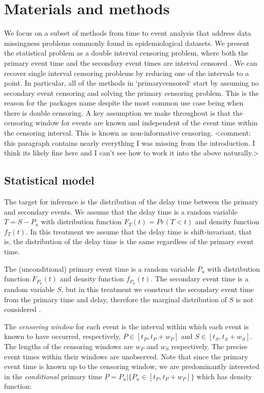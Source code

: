 \documentclass[10pt,letterpaper]{article}
\begin{document}
\section*{Materials and methods}


We focus on a subset of methods from time to event analysis that address data missingness problems commonly found in epidemiological datasets. We present the statistical problem as a double interval censoring problem, where both the primary event time and the secondary event times are interval censored \cite{Reich2009-aa}. We can recover single interval censoring problems by reducing one of the intervals to a point. In particular, all of the methods in `primarycensored` start by assuming no secondary event censoring and solving the primary censoring problem. This is the reason for the packages name despite the most common use case being when there is double censoring. A key assumption we make throughout is that the censoring window for events are known and independent of the event time within the censoring interval. This is known as non-informative censoring. <comment: this paragraph contains nearly everything I was missing from the introduction. I think its likely fine here and I can't see how to work it into the above naturally.>

\subsection*{Statistical model}
The target for inference is the distribution of the delay time between the primary and secondary events. We assume that the delay time is a random variable $T = S - P_{u}$ with distribution function $F_T(t) = Pr(T < t)$ and density function $f_T(t)$. In this treatment we assume that the delay time is shift-invariant, that is, the distribution of the delay time is the same regardless of the primary event time.

The (unconditional) primary event time is a random variable $P_{u}$ with distribution function $F_{P_{u}}(t)$ and density function $f_{P_{u}}(t)$. The secondary event time is a random variable $S$, but in this treatment we construct the secondary event time from the primary time and delay, therefore the marginal distribution of $S$ is not considered \cite{Park2024.01.12.24301247} .

The \textit{censoring window} for each event is the interval within which each event is known to have occurred, respectively, $P \in [t_P, t_P + w_P]$ and $S \in [t_S, t_S + w_S]$. The lengths of the censoring windows are $w_P$ and $w_S$ respectively. The precise event times within their windows are unobserved. Note that since the primary event time is known up to the censoring window, we are predominantly interested in the \textit{conditional} primary time $P = P_{u} | \{ P_{u} \in [t_P, t_P + w_P]\}$ which has density function:
\end{document}
